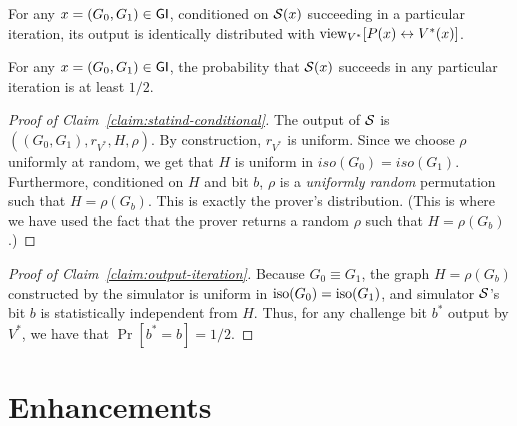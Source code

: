 \documentclass[11pt]{article}
\begin{document}
\begin{claim}
  \label{claim:statind-conditional}
  For any $x = (G_{0},G_{1}) \in \mathsf{GI}$, conditioned on $\mathcal{S}(x)$
  succeeding in a particular iteration, its output is identically
  distributed with $\text{view}_{V^{*}}[ P(x) \leftrightarrow V^{*}(x) ]$.
\end{claim}

\begin{claim}
  \label{claim:output-iteration}
  For any $x = (G_{0},G_{1}) \in \mathsf{GI}$, the probability that $\mathcal{S}(x)$
  succeeds in any particular iteration is at least $1/2$.
\end{claim}

\begin{proof}[Proof of Claim~\ref{claim:statind-conditional}]
  The output of $\mathcal{S}$ is $((G_{0}, G_{1}), r_{V^*},H,\rho)$. By
  construction, $r_{V^*}$ is uniform.  Since we choose $\rho$
  uniformly at random, we get that $H$ is uniform in
  $iso(G_0)=iso(G_1)$.  Furthermore, conditioned on $H$ and bit $b$,
  $\rho$ is a \emph{uniformly random} permutation such that
  $H=\rho(G_b)$.  This is exactly the prover's distribution.  (This is
  where we have used the fact that the prover returns a random $\rho$
  such that $H = \rho(G_{b})$.)
\end{proof}

\begin{proof}[Proof of Claim~\ref{claim:output-iteration}]
  Because $G_0 \equiv G_1$, the graph $H=\rho(G_{b})$ constructed by
  the simulator is uniform in $\text{iso}(G_{0}) = \text{iso}(G_{1})$, and
  simulator $\mathcal{S}$'s bit $b$ is statistically independent from $H$.
  Thus, for any challenge bit $b^{*}$ output by $V^*$, we have that
  $\Pr[b^{*}=b] = 1/2$.
\end{proof}

\section{Enhancements}
\label{sec:enhancements}
\end{document}
